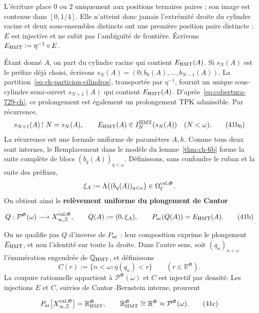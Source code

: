 L’écriture place \(0\) ou \(2\) uniquement aux positions ternaires
paires ; son image est contenue dans \([0,1/4]\). Elle n’atteint donc jamais
l’extrémité droite du cylindre racine et deux sous-ensembles distincts ont une
première position paire distincte : \(E\) est injective et ne subit pas l’ambiguïté de
frontière. Écrivons \(E_{\rm HMT}:=\eta^{-1}\circ E\).

Étant donné \(A\), on part du cylindre racine qui contient \(E_{\rm HMT}(A)\). Si \(s_N(A)\) est le préfixe déjà choisi, écrivons \(s_N(A)=(0;b_0(A),\ldots,b_{N-1}(A))\). La partition~\eqref{eq:ch-particion-cilindros}, transportée par \(\eta^{-1}\), fournit un unique sous-cylindre semi-ouvert \(s_{N+1}(A)\) qui contient \(E_{\rm HMT}(A)\). D'après~\eqref{eq:cobertura-729-ch}, ce prolongement est également un prolongement TPK admissible. Par récurrence,
\[
 s_{N+1}(A)\!\upharpoonright N=s_N(A),\qquad
 E_{\rm HMT}(A)\in I_N^{\rm HMT}(s_N(A))\quad(N<\omega).
\tag{41b$_0$}\label{eq:ch-prefijos-uniformes}
\]
La récurrence est une formule uniforme de paramètres \(A,h\). Comme tous deux sont
internes, le Remplacement dans le modèle du lemme~\ref{thm:ch-6b} forme la suite complète de
blocs \((b_q(A))_{q<\omega}\). Définissons, sans confondre le ruban et la
suite des préfixes,
\[
 \xi_A:=\Lambda\bigl((b_q(A))_{q<\omega}\bigr)
 \in\Omega_\Gamma^{\rm cal,\mathfrak G}.
\]
On obtient ainsi le \textbf{relèvement uniforme du plongement de Cantor}

\[
 Q:\mathcal P^{\mathfrak G}(\omega)
 \longrightarrow X_{\infty,\mathbb Z}^{\rm cal,\mathfrak G},
 \qquad
 Q(A):=(0,\xi_A),\qquad
 P_{\rm ar}(Q(A))=E_{\rm HMT}(A).
\tag{41b}\label{eq:ch-levantamiento-uniforme}
\]

On ne qualifie pas \(Q\) d'inverse de \(P_{\rm ar}\) : leur composition exprime le plongement \(E_{\rm HMT}\), et non l'identité sur toute la droite. Dans l'autre sens, soit \((q_n)_{n<\omega}\) l'énumération engendrée de \(\mathbb Q_{\rm HMT}\), et définissons
\[
 C(r):=\{n<\omega:\eta(q_n)<r\}
 \qquad(r\in\mathbb R^{\mathfrak G}).
\]
La coupure rationnelle appartient à \(\mathcal P^{\mathfrak G}(\omega)\) et \(C\) est injectif par densité. Les injections \(E\) et \(C\), suivies de Cantor--Bernstein interne, prouvent

\[
 P_{\rm ar}
 \bigl[X_{\infty,\mathbb Z}^{\rm cal,\mathfrak G}\bigr]
 =\mathbb R_{\rm HMT}^{\mathfrak G},
 \qquad
 \mathbb R_{\rm HMT}^{\mathfrak G}
 \cong\mathbb R^{\mathfrak G}
 \approx\mathcal P^{\mathfrak G}(\omega).
\tag{41c}\label{eq:ch-recta-potencia}
\]

